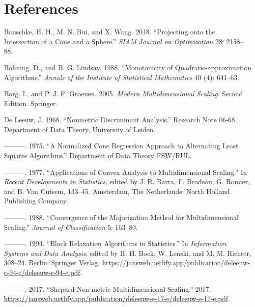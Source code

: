 \documentclass[
  12pt,
  letterpaper,
  DIV=11,
  numbers=noendperiod]{scrartcl}
\newlength{\cslhangindent}
\newenvironment{CSLReferences}[2] %
 {\begin{list}{}{%
  \setlength{\itemindent}{0pt}
  \setlength{\leftmargin}{0pt}
  \setlength{\parsep}{0pt}
  \ifodd #1
   \setlength{\leftmargin}{\cslhangindent}
   \setlength{\itemindent}{-1\cslhangindent}
  \fi
  \setlength{\itemsep}{#2\baselineskip}}}
 {\end{list}}
\newcommand{\sectionbreak}{\clearpage}
\theoremstyle{plain}
\theoremstyle{remark}
\begin{document}
\sectionbreak

\section*{References}\label{references}

\label{refs}
\begin{CSLReferences}{1}{0}
Bauschke, H. H., M. N. Bui, and X. Wang. 2018. {``{Projecting onto the
Intersection of a Cone and a Sphere}.''} \emph{SIAM Journal on
Optimization} 28: 2158--88.

Böhning, D., and B. G. Lindsay. 1988. {``{Monotonicity of
Quadratic-approximation Algorithms}.''} \emph{Annals of the Institute of
Statistical Mathematics} 40 (4): 641--63.

Borg, I., and P. J. F. Groenen. 2005. \emph{Modern Multidimensional
Scaling}. Second Edition. Springer.

De Leeuw, J. 1968. {``Nonmetric Discriminant Analysis.''} Research Note
06-68. Department of Data Theory, University of Leiden.

---------. 1975. {``{A Normalized Cone Regression Approach to
Alternating Least Squares Algorithms}.''} Department of Data Theory
FSW/RUL.

---------. 1977. {``Applications of Convex Analysis to Multidimensional
Scaling.''} In \emph{Recent Developments in Statistics}, edited by J. R.
Barra, F. Brodeau, G. Romier, and B. Van Cutsem, 133--45. Amsterdam, The
Netherlands: North Holland Publishing Company.

---------. 1988. {``Convergence of the Majorization Method for
Multidimensional Scaling.''} \emph{Journal of Classification} 5:
163--80.

---------. 1994. {``{Block Relaxation Algorithms in Statistics}.''} In
\emph{Information Systems and Data Analysis}, edited by H. H. Bock, W.
Lenski, and M. M. Richter, 308--24. Berlin: Springer Verlag.
\url{https://jansweb.netlify.app/publication/deleeuw-c-94-c/deleeuw-c-94-c.pdf}.

---------. 2017. {``{Shepard Non-metric Multidimensional Scaling}.''}
2017.
\url{https://jansweb.netlify.app/publication/deleeuw-e-17-e/deleeuw-e-17-e.pdf}.


\end{CSLReferences}
\end{document}
